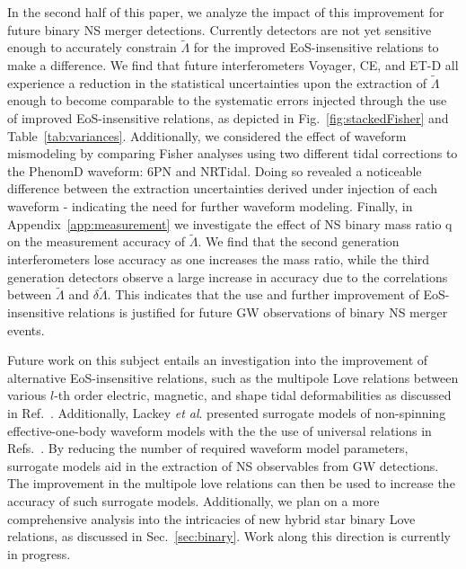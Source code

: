 \documentclass[prd,twocolumn,nofootinbib,superscriptaddress,amsmath,amssymb]{revtex4-1}
\begin{document}
In the second half of this paper, we analyze the impact of this improvement for future binary NS merger detections.
Currently detectors are not yet sensitive enough to accurately constrain $\tilde{\Lambda}$ for the improved EoS-insensitive relations to make a difference.
We find that future interferometers Voyager, CE, and ET-D all experience a reduction in the statistical uncertainties upon the extraction of $\tilde{\Lambda}$ enough to become comparable to the systematic errors injected through the use of improved EoS-insensitive relations, as depicted in Fig.~\ref{fig:stackedFisher} and Table~\ref{tab:variances}.
Additionally, we considered the effect of waveform mismodeling by comparing Fisher analyses using two different tidal corrections to the PhenomD waveform: 6PN and NRTidal.
Doing so revealed a noticeable difference between the extraction uncertainties derived under injection of each waveform - indicating the need for further waveform modeling.
Finally, in Appendix~\ref{app:measurement} we investigate the effect of NS binary mass ratio q on the measurement accuracy of $\tilde\Lambda$.
We find that the second generation interferometers lose accuracy as one increases the mass ratio, while the third generation detectors observe a large increase in accuracy due to the correlations between $\tilde\Lambda$ and $\delta\tilde\Lambda$.
This indicates that the use and further improvement of EoS-insensitive relations is justified for future GW observations of binary NS merger events.

Future work on this subject entails an investigation into the improvement of alternative EoS-insensitive relations, such as the multipole Love relations between various $l$-th order electric, magnetic, and shape tidal deformabilities as discussed in Ref.~\cite{Yagi:Multipole}.
Additionally, Lackey \emph{et al}. presented surrogate models of non-spinning effective-one-body waveform models with the the use of universal relations in Refs.~\cite{Lackey:Surrogate, Lackey:EOB}.
By reducing the number of required waveform model parameters, surrogate models aid in the extraction of NS observables from GW detections.
The improvement in the multipole love relations can then be used to increase the accuracy of such surrogate models.
Additionally, we plan on a more comprehensive analysis into the intricacies of new hybrid star binary Love relations, as discussed in Sec.~\ref{sec:binary}.
Work along this direction is currently in progress.

\end{document}
